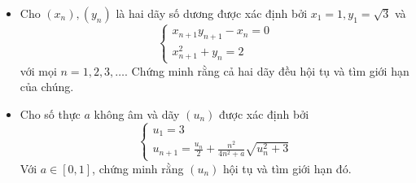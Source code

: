 \documentclass[11pt]{scrartcl}
\begin{document}
\begin{itemize}[label=, leftmargin=0em, itemsep=-0em]

    \item \begin{btvn}
        Cho $({{x}_{n}}),({{y}_{n}})$ là hai dãy số dương được xác định bởi ${{x}_{1}}=1,{{y}_{1}}=\sqrt{3}$ và
        \[ \begin{cases} {{x}_{n+1}}{{y}_{n+1}}-{{x}_{n}}=0 \\ x_{n+1}^{2}+{{y}_{n}}=2 \end{cases} \] với mọi $n=1,2,3,\ldots$.
Chứng minh rằng cả hai dãy đều hội tụ và tìm giới hạn của chúng.
    \end{btvn}

    
    \item \begin{btvn}
        Cho số thực $a$ không âm và dãy $(u_n)$ được xác định bởi\[ \begin{cases} u_1=3\\ u_{n+1}=\frac{u_n}{2}+\frac{n^2}{4n^2+a}\sqrt{u_n^2+3} \end{cases} \]
    Với $a\in [0,1]$, chứng minh rằng $(u_n)$ hội tụ và tìm giới hạn đó.
    \end{btvn}


\end{itemize}
\end{document}
